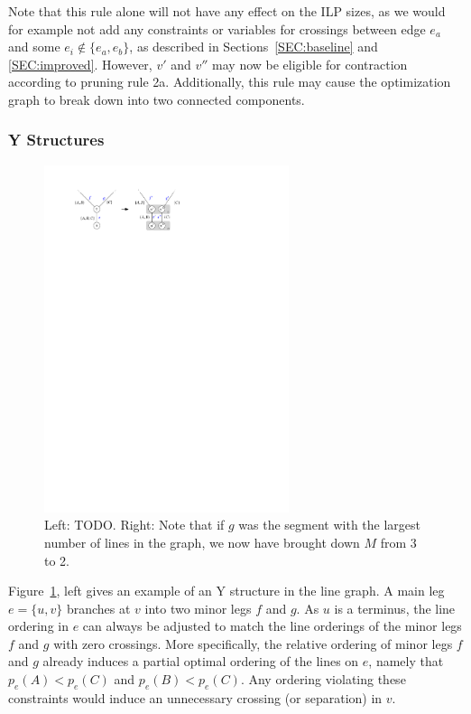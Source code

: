 \documentclass[format=acmsmall, review=false, screen=true]{acmart}
\begin{document}
Note that this rule alone will not have any effect on the ILP sizes, as we would for example not add any constraints or variables for crossings between edge $e_a$ and some $e_i \not\in \{e_a, e_b\}$, as described in Sections~\ref{SEC:baseline} and \ref{SEC:improved}.
However, $v'$ and $v''$ may now be eligible for contraction according to pruning rule 2a.
Additionally, this rule may cause the optimization graph to break down into two connected components.

\subsubsection{Y Structures}

\begin{figure}
  \centering
  \includegraphics[width=0.64\textwidth]{untangling/y.pdf}
  \caption{Left: TODO. Right: Note that if $g$ was the segment with the largest number of lines in the graph, we now have brought down $M$ from 3 to 2.}  
  \label{FIG:untangle_y}
\end{figure}

Figure~\ref{FIG:untangle_y}, left gives an example of an Y structure in the line graph.
A main leg $e = \{u, v\}$ branches at $v$ into two minor legs $f$ and $g$.
As $u$ is a terminus, the line ordering in $e$ can always be adjusted to match the line orderings of the minor legs $f$ and $g$ with zero crossings.
More specifically, the relative ordering of minor legs $f$ and $g$ already induces a partial optimal ordering of the lines on $e$, namely that $p_e(A) < p_e(C)$ and $p_e(B) < p_e(C)$.
Any ordering violating these constraints would induce an unnecessary crossing (or separation) in $v$.
\end{document}
